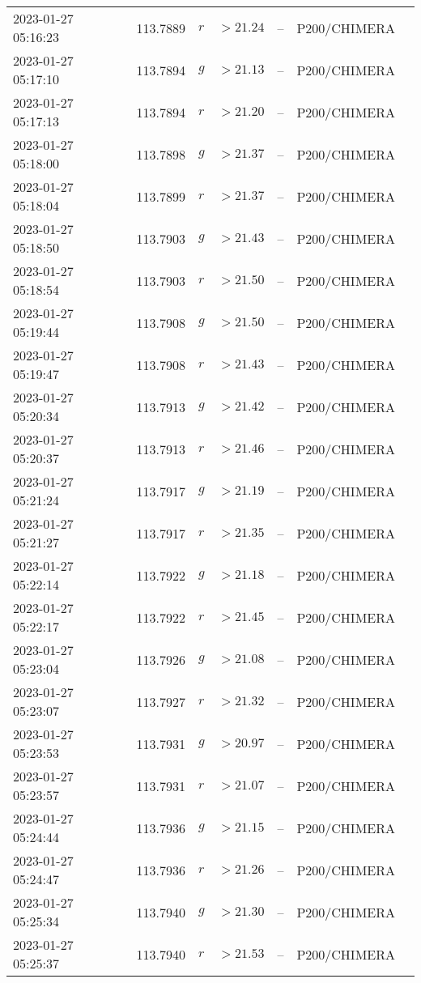 \documentclass{nature_plusfigure}
\begin{document}
\begin{supplement}
\begin{center}
\begin{longtable}{lllllll}
2023-01-27 05:16:23 & 113.7889 & $r$ & $>21.24$ & -- & P200/CHIMERA &  \\ 
2023-01-27 05:17:10 & 113.7894 & $g$ & $>21.13$ & -- & P200/CHIMERA &  \\ 
2023-01-27 05:17:13 & 113.7894 & $r$ & $>21.20$ & -- & P200/CHIMERA &  \\ 
2023-01-27 05:18:00 & 113.7898 & $g$ & $>21.37$ & -- & P200/CHIMERA &  \\ 
2023-01-27 05:18:04 & 113.7899 & $r$ & $>21.37$ & -- & P200/CHIMERA &  \\ 
2023-01-27 05:18:50 & 113.7903 & $g$ & $>21.43$ & -- & P200/CHIMERA &  \\ 
2023-01-27 05:18:54 & 113.7903 & $r$ & $>21.50$ & -- & P200/CHIMERA &  \\ 
2023-01-27 05:19:44 & 113.7908 & $g$ & $>21.50$ & -- & P200/CHIMERA &  \\ 
2023-01-27 05:19:47 & 113.7908 & $r$ & $>21.43$ & -- & P200/CHIMERA &  \\ 
2023-01-27 05:20:34 & 113.7913 & $g$ & $>21.42$ & -- & P200/CHIMERA &  \\ 
2023-01-27 05:20:37 & 113.7913 & $r$ & $>21.46$ & -- & P200/CHIMERA &  \\ 
2023-01-27 05:21:24 & 113.7917 & $g$ & $>21.19$ & -- & P200/CHIMERA &  \\ 
2023-01-27 05:21:27 & 113.7917 & $r$ & $>21.35$ & -- & P200/CHIMERA &  \\ 
2023-01-27 05:22:14 & 113.7922 & $g$ & $>21.18$ & -- & P200/CHIMERA &  \\ 
2023-01-27 05:22:17 & 113.7922 & $r$ & $>21.45$ & -- & P200/CHIMERA &  \\ 
2023-01-27 05:23:04 & 113.7926 & $g$ & $>21.08$ & -- & P200/CHIMERA &  \\ 
2023-01-27 05:23:07 & 113.7927 & $r$ & $>21.32$ & -- & P200/CHIMERA &  \\ 
2023-01-27 05:23:53 & 113.7931 & $g$ & $>20.97$ & -- & P200/CHIMERA &  \\ 
2023-01-27 05:23:57 & 113.7931 & $r$ & $>21.07$ & -- & P200/CHIMERA &  \\ 
2023-01-27 05:24:44 & 113.7936 & $g$ & $>21.15$ & -- & P200/CHIMERA &  \\ 
2023-01-27 05:24:47 & 113.7936 & $r$ & $>21.26$ & -- & P200/CHIMERA &  \\ 
2023-01-27 05:25:34 & 113.7940 & $g$ & $>21.30$ & -- & P200/CHIMERA &  \\ 
2023-01-27 05:25:37 & 113.7940 & $r$ & $>21.53$ & -- & P200/CHIMERA &  \\ 

\end{longtable}
\end{center}
\end{supplement}
\end{document}
